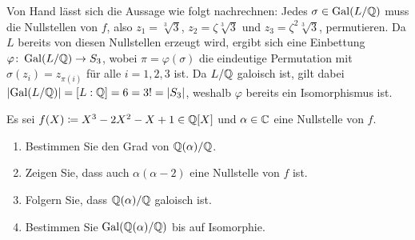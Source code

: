 \begin{solution}
\begin{enumerate}
      Von Hand lässt sich die Aussage wie folgt nachrechnen:
      Jedes $\sigma \in \operatorname{Gal}(L/\mathbb{Q})$ muss die Nullstellen von $f$, also $z_1 = \sqrt[3]{3}$, $z_2 = \zeta \sqrt[3]{3}$ und $z_3 = \zeta^2 \sqrt[3]{3}$, permutieren.
      Da $L$ bereits von diesen Nullstellen erzeugt wird, ergibt sich eine Einbettung $\varphi \colon \operatorname{Gal}(L/\mathbb{Q}) \to S_3$, wobei $\pi = \varphi(\sigma)$ die eindeutige Permutation mit $\sigma(z_i) = z_{\pi(i)}$ für alle $i = 1, 2, 3$ ist.
      Da $L/\mathbb{Q}$ galoisch ist, gilt dabei $|{\operatorname{Gal}(L/\mathbb{Q})}| = [L : \mathbb{Q}] = 6 = 3! = |S_3|$, weshalb $\varphi$ bereits ein Isomorphismus ist.
  \end{enumerate}
\end{solution}


\begin{question}
  Es sei $f(X) \coloneqq X^3 - 2 X^2 - X + 1 \in \mathbb{Q}[X]$ und $\alpha \in \mathbb{C}$ eine Nullstelle von $f$.
  \begin{enumerate}
    \item
      Bestimmen Sie den Grad von $\mathbb{Q}(\alpha) / \mathbb{Q}$.
    \item
      Zeigen Sie, dass auch $\alpha(\alpha-2)$ eine Nullstelle von $f$ ist.
    \item
      Folgern Sie, dass $\mathbb{Q}(\alpha)/\mathbb{Q}$ galoisch ist.
    \item
      Bestimmen Sie $\operatorname{Gal}(\mathbb{Q}(\alpha)/\mathbb{Q})$ bis auf Isomorphie.
  \end{enumerate}
\end{question}


